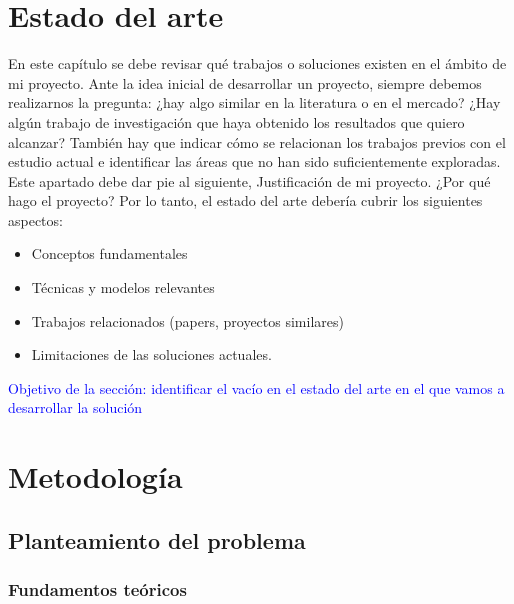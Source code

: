 \documentclass[12pt]{extarticle}
\numberwithin{equation}{section}
\begin{document}
\begin{refsection}
\section{Estado del arte}\label{sec:related} 
{\color{red}
En este capítulo se debe revisar qué trabajos o soluciones existen en el ámbito de mi proyecto. Ante la idea inicial de desarrollar un proyecto, siempre debemos realizarnos la pregunta: ¿hay algo similar en la literatura o en el mercado? ¿Hay algún trabajo de investigación que haya obtenido los resultados que quiero alcanzar?
También hay que indicar cómo se relacionan los trabajos previos con el estudio actual e identificar las áreas que no han sido suficientemente exploradas.
 Este apartado debe dar pie al siguiente, Justificación de mi proyecto. ¿Por qué hago el proyecto?
Por lo tanto, el estado del arte debería cubrir los siguientes aspectos: 

\begin{itemize}
    \item Conceptos fundamentales 
    \item Técnicas y modelos relevantes
    \item Trabajos relacionados (papers, proyectos similares)
    \item Limitaciones de las soluciones actuales.
\end{itemize}
}

\textcolor{blue}{Objetivo de la secci\'on: identificar el vac\'io en el estado del arte en el que vamos a desarrollar la soluci\'on}

\newpage


\section{Metodolog\'ia}\label{sec:methodology}

\subsection{Planteamiento del problema}
\label{subsec:planteamientoproblema}

\subsubsection{Fundamentos teóricos}
\label{subsubsec:marcoteorico}


\end{refsection}
\end{document}
